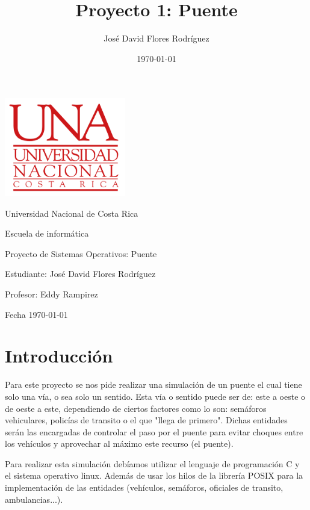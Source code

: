 \documentclass[16pt,a4papper]{article}
\title{Proyecto 1: Puente}
\author{José David Flores Rodríguez}
\date{\today}
\begin{document}
	\begin{center}
		
		\includegraphics[width=200px]{Logo-UNA.png}
		\vspace{1cm}

	
		\large
		Universidad Nacional de Costa Rica
		\vspace{1cm}
		
	
		\large
		Escuela de informática
		\vspace{1cm}
		

		\large
		Proyecto de Sistemas Operativos: Puente
		\vspace{1cm}
		

		\large
		Estudiante: José David Flores Rodríguez
		\vspace{1cm}
		
	
		\large
		Profesor: Eddy Rampirez
		\vspace{1cm}
	
		\large
		Fecha \today
		\vspace{1cm}
	\end{center}
	
	\newpage
	\section{Introducción}
	Para este proyecto se nos pide realizar una simulación de un puente el cual tiene solo una vía, o sea solo un sentido. Esta vía o sentido puede ser de: este a oeste o de oeste a este, dependiendo de ciertos factores como lo son: semáforos vehiculares, policías de transito o el que "llega de primero". Dichas entidades serán las encargadas de controlar el paso por el puente para evitar choques entre los vehículos y aprovechar al máximo este recurso (el puente).\par
	
	Para realizar esta simulación debíamos utilizar el lenguaje de programación C y el sistema operativo linux. Además de usar los hilos de la librería POSIX para la implementación de las entidades (vehículos, semáforos, oficiales de transito, ambulancias...).\par
\end{document}
